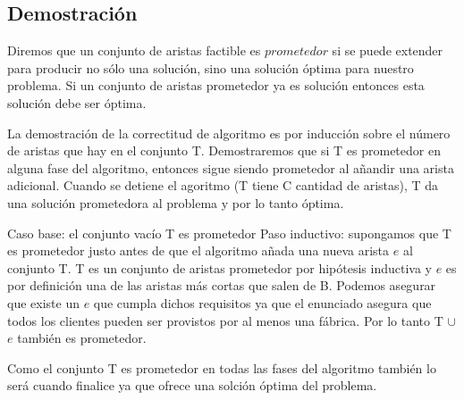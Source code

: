 \subsection{Demostración}

Diremos que un conjunto de aristas factible es $prometedor$ si se puede extender para producir no sólo una solución, sino una solución óptima para nuestro problema. Si un conjunto de aristas prometedor ya es solución entonces esta solución debe ser óptima.

La demostración de la correctitud de algoritmo es por inducción sobre el número de aristas que hay en el conjunto T. Demostraremos que si T es prometedor en alguna fase del algoritmo, entonces sigue siendo prometedor al añandir una arista adicional. Cuando se detiene el agoritmo (T tiene C cantidad de aristas), T da una solución prometedora al problema y por lo tanto óptima.

Caso base: el conjunto vacío T es prometedor
Paso inductivo: supongamos que T es prometedor justo antes de que el algoritmo añada una nueva arista $e$ al conjunto T. T es un conjunto de aristas prometedor por hipótesis inductiva y $e$ es por definición una de las aristas más cortas que salen de B. Podemos asegurar que existe un $e$ que cumpla dichos requisitos ya que el enunciado asegura que todos los clientes pueden ser provistos por al menos una fábrica. Por lo tanto T $\cup$ $e$ también es prometedor.

Como el conjunto T es prometedor en todas las fases del algoritmo también lo será cuando finalice ya que ofrece una solción óptima del problema.

